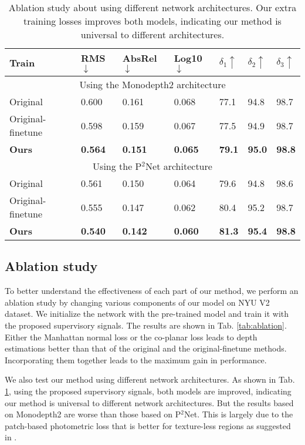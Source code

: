 \documentclass[10pt,twocolumn,letterpaper]{article}
\newcommand{\Tab}[1]{Tab. \ref{#1}}
\begin{document}
\begin{table}
\scriptsize
	\centering
	\begin{tabularx}{0.48\textwidth}{|l|XXX|XXX|}
		\hline
		Train & RMS$\downarrow$ & AbsRel$\downarrow$ & Log10$\downarrow$  & $\delta_1\uparrow$ & $\delta_2\uparrow$ & $\delta_3\uparrow$ \\
		\hline
		\hline
		\multicolumn{7}{|c|}{Using the Monodepth2 \cite{godard2019digging} architecture} \\
		\hline
		Original & 0.600 & 0.161 & 0.068 & 77.1 & 94.8  & 98.7 \\
		Original-finetune & 0.598 & 0.159 & 0.067 & 77.5 & 94.9  & 98.7 \\
		\textbf{Ours}  & \textbf{0.564}  & \textbf{0.151} & \textbf{0.065} & \textbf{79.1}  & \textbf{95.0}  & \textbf{98.8} \\
		\hline
		\hline
		\multicolumn{7}{|c|}{Using the P$^{2}$Net \cite{yu2020p} architecture} \\
		\hline
		Original & 0.561 & 0.150 & 0.064 & 79.6  & 94.8  & 98.6 \\
		Original-finetune & 0.555 & 0.147  & 0.062 & 80.4  & 95.2  & 98.7 \\
\textbf{Ours}  & \textbf{0.540} & \textbf{0.142} & 
		\textbf{0.060} & \textbf{81.3}  & \textbf{95.4}  & \textbf{98.8} \\
		\hline
	\end{tabularx}
	\newline
	\caption{Ablation study about using different network architectures. Our extra training losses improves both models, indicating our method is universal to different architectures. }
	\label{tab:diff baseline}  
\end{table} 

\subsection{Ablation study}
To better understand the effectiveness of each part of our method, we perform an ablation study by changing various components of our model on NYU V2 dataset. We initialize the network with the pre-trained model \cite{yu2020p} and train it with the proposed supervisory signals. The results are shown in \Tab{tab:ablation}. Either the Manhattan normal loss or the co-planar loss leads to depth estimations better than that of the original and the original-finetune methods. 
Incorporating them together leads to the maximum gain in performance.

We also test our method using different network architectures. As shown in \Tab{tab:diff baseline}, using the proposed supervisory signals, both models are improved, indicating our method is universal to different network architectures. But the results based on Monodepth2 are worse than those based on P$^2$Net. This is largely due to the patch-based photometric loss that is better for texture-less regions as suggested in \cite{yu2020p}.
\end{document}
